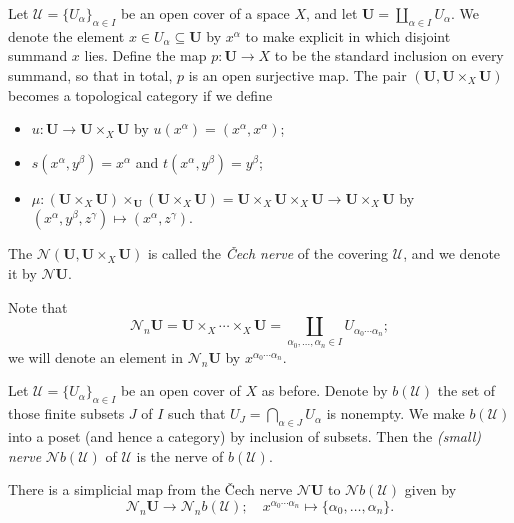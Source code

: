 \documentclass[a4paper,openany]{scrbook}
\newcommand{\nerve}{\mathcal N}
\begin{document}
\begin{example}
Let $\mathcal U = \{U_\alpha\}_{\alpha \in I}$ be an open cover of a space $X$, and let $\mathbf U = \coprod_{\alpha \in I} U_\alpha$. We denote the element $x \in U_\alpha \subseteq \mathbf U$ by $x^{\alpha}$ to make explicit in which disjoint summand $x$ lies. Define the map $p\colon \mathbf U \to X$ to be the standard inclusion on every summand, so that in total, $p$ is an open surjective map.
The pair $(\mathbf U,\mathbf U \times_X \mathbf U)$ becomes a topological category if we define
\begin{itemize}
\item $u\colon \mathbf U \to \mathbf U \times_X \mathbf U$ by $u(x^\alpha) = (x^\alpha,x^\alpha)$;
\item $s(x^\alpha,y^\beta) = x^\alpha$ and $t(x^\alpha,y^\beta) = y^\beta$;
\item $\mu\colon (\mathbf U \times_X \mathbf U) \times_{\mathbf U} (\mathbf U \times_X \mathbf U) = \mathbf U \times_X \mathbf U \times_X \mathbf U \to \mathbf U \times_X \mathbf U$ by $(x^\alpha,y^\beta,z^\gamma) \mapsto (x^\alpha,z^\gamma)$.
\end{itemize}
The $\nerve(\mathbf U,\mathbf U \times_X \mathbf U)$ is called the \emph{\v Cech nerve} of the covering $\mathcal U$, and we denote it by $\nerve\mathbf U$.
\end{example}

Note that
\[
\nerve_n\mathbf U = \mathbf U \times_X \cdots \times_X \mathbf U = \coprod_{\alpha_0,\dots,\alpha_n \in I} U_{\alpha_0\cdots\alpha_n};
\]
we will denote an element in $\nerve_n\mathbf U$ by $x^{\alpha_0\cdots\alpha_n}$.

\begin{example} 
Let $\mathcal U = \{U_\alpha\}_{\alpha \in I}$ be an open cover of $X$ as before. Denote by $b(\mathcal U)$ the set of those finite subsets $J$ of $I$ such that $U_J = \bigcap_{\alpha \in J} U_\alpha$ is nonempty. We make $b(\mathcal U)$ into a poset (and hence a category) by inclusion of subsets. Then the \emph{(small) nerve} $\nerve b(\mathcal U)$ of $\mathcal U$ is the nerve of $b(\mathcal U)$.
\end{example}

There is a simplicial map from the \v Cech nerve $\nerve\mathbf U$ to $\nerve b(\mathcal U)$ given by
\[
\nerve_n\mathbf U \to \nerve_nb(\mathcal U); \quad x^{\alpha_0\cdots\alpha_n} \mapsto \{\alpha_0,\dots,\alpha_n\}.
\]
\end{document}
